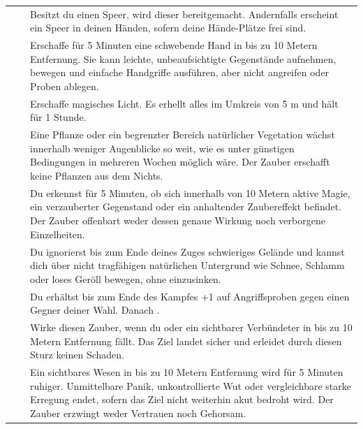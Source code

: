 \begin{xltabular}{\linewidth}{L{3.4cm} C{2.1cm} Y}
 &  & Besitzt du einen Speer, wird dieser bereitgemacht. Andernfalls erscheint ein Speer in deinen Händen, sofern deine Hände-Plätze frei sind. \\
 &  & Erschaffe für 5 Minuten eine schwebende Hand in bis zu 10 Metern Entfernung. Sie kann leichte, unbeaufsichtigte Gegenstände aufnehmen, bewegen und einfache Handgriffe ausführen, aber nicht angreifen oder Proben ablegen. \\
 &  & Erschaffe magisches Licht. Es erhellt alles im Umkreis von 5 m und hält für 1 Stunde. \\
 &  & Eine Pflanze oder ein begrenzter Bereich natürlicher Vegetation wächst innerhalb weniger Augenblicke so weit, wie es unter günstigen Bedingungen in mehreren Wochen möglich wäre. Der Zauber erschafft keine Pflanzen aus dem Nichts. \\
 &  & Du erkennst für 5 Minuten, ob sich innerhalb von 10 Metern aktive Magie, ein verzauberter Gegenstand oder ein anhaltender Zaubereffekt befindet. Der Zauber offenbart weder dessen genaue Wirkung noch verborgene Einzelheiten. \\
 &  & Du ignorierst bis zum Ende deines Zuges schwieriges Gelände und kannst dich über nicht tragfähigen natürlichen Untergrund wie Schnee, Schlamm oder loses Geröll bewegen, ohne einzusinken. \\
 &  & Du erhältst bis zum Ende des Kampfes +1\blueDie{} auf Angriffsproben gegen einen Gegner deiner Wahl. Danach \exhaust{}. \\
 &  & Wirke diesen Zauber, wenn du oder ein sichtbarer Verbündeter in bis zu 10 Metern Entfernung fällt. Das Ziel landet sicher und erleidet durch diesen Sturz keinen Schaden. \\
 &  & Ein sichtbares Wesen in bis zu 10 Metern Entfernung wird für 5 Minuten ruhiger. Unmittelbare Panik, unkontrollierte Wut oder vergleichbare starke Erregung endet, sofern das Ziel nicht weiterhin akut bedroht wird. Der Zauber erzwingt weder Vertrauen noch Gehorsam. \\
\end{xltabular}
\endgroup

